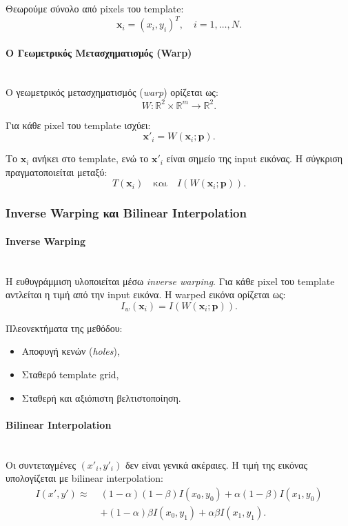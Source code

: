 \documentclass[12pt]{article}
\begin{document}
Θεωρούμε σύνολο από pixels του template:
\[
\mathbf{x}_i = (x_i, y_i)^T, \quad i = 1,\ldots,N.
\]

\paragraph{Ο Γεωμετρικός Μετασχηματισμός (Warp)}
\mbox{}\\
Ο γεωμετρικός μετασχηματισμός (\textit{warp}) ορίζεται ως:
\[
W:\mathbb{R}^2 \times \mathbb{R}^m \rightarrow \mathbb{R}^2.
\]

Για κάθε pixel του template ισχύει:
\[
\mathbf{x}'_i = W(\mathbf{x}_i;\mathbf{p}).
\]

Το \(\mathbf{x}_i\) ανήκει στο template, ενώ το \(\mathbf{x}'_i\) είναι σημείο της input εικόνας.  
Η σύγκριση πραγματοποιείται μεταξύ:
\[
T(\mathbf{x}_i) \quad \text{και} \quad I(W(\mathbf{x}_i;\mathbf{p})).
\]

\subsubsection{Inverse Warping και Bilinear Interpolation}

\paragraph{Inverse Warping}
\mbox{}\\
Η ευθυγράμμιση υλοποιείται μέσω \textit{inverse warping}. Για κάθε pixel του template αντλείται η τιμή από την input εικόνα. Η warped εικόνα ορίζεται ως:
\[
I_w(\mathbf{x}_i) = I(W(\mathbf{x}_i;\mathbf{p})).
\]

Πλεονεκτήματα της μεθόδου:
\begin{itemize}
    \item Αποφυγή κενών (\textit{holes}),
    \item Σταθερό template grid,
    \item Σταθερή και αξιόπιστη βελτιστοποίηση.
\end{itemize}

\paragraph{Bilinear Interpolation}
\mbox{}\\
Οι συντεταγμένες \((x'_i,y'_i)\) δεν είναι γενικά ακέραιες. Η τιμή της εικόνας υπολογίζεται με bilinear interpolation:
\[
\begin{aligned}
I(x',y') \approx\;& (1-\alpha)(1-\beta)I(x_0,y_0)
+ \alpha(1-\beta)I(x_1,y_0) \\
&+ (1-\alpha)\beta I(x_0,y_1)
+ \alpha\beta I(x_1,y_1).
\end{aligned}
\]
\end{document}
